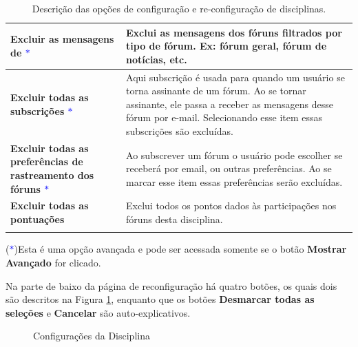 \begin{longtable}[htbp!]{p{6cm}|p{9cm}}
\textbf{Excluir as mensagens de \textcolor{blue}{$\ast$}} & Exclui as mensagens dos fóruns filtrados por tipo de fórum.
Ex: fórum geral, fórum de notícias, etc.\\\hline
\textbf{Excluir todas as subscrições \textcolor{blue}{$\ast$}} & Aqui subscrição é usada para quando um usuário se torna assinante de um fórum. Ao se tornar assinante, ele passa a receber as mensagens desse fórum por e-mail. Selecionando esse item essas subscrições são excluídas.\\\hline
\textbf{Excluir todas as preferências de rastreamento dos fóruns \textcolor{blue}{$\ast$}} & Ao subscrever um fórum o usuário pode escolher se receberá por email, ou outras preferências. Ao se marcar esse item essas preferências serão excluídas. \\\hline
\textbf{Excluir todas as pontuações} & Exclui todos os pontos dados às participações nos fóruns desta disciplina.\\\hline
\caption{Descrição das opções de configuração e re-configuração de disciplinas.}
  \label{tab:Conf3}
\end{longtable}
(\textcolor{blue}{$\ast$})Esta é uma opção avançada e pode ser acessada somente se o botão \textbf{Mostrar Avançado} for clicado.

Na parte de baixo da página de reconfiguração há quatro botões, os quais dois são descritos na Figura \ref{fig:cap3_24}, enquanto 
que os botões \textbf{Desmarcar todas as seleções} e \textbf{Cancelar} são auto-explicativos.

\begin{figure}[htbp]
 \begin{center}
  \caption{Configurações da Disciplina}
  \label{fig:cap3_24}
 \end{center}
\end{figure}
